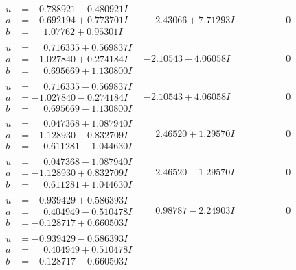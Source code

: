 \documentclass[1p]{elsarticle_modified}
\theoremstyle{definition}
\begin{document}
$$\begin{array}{c|c|c}
\begin{aligned}
u &= -0.788921 - 0.480921 I \\
a &= -0.692194 + 0.773701 I \\
b &= \phantom{-}1.07762 + 0.95301 I\end{aligned}
 & \phantom{-}2.43066 + 7.71293 I & \phantom{-0.000000 } 0 \\ \hline\begin{aligned}
u &= \phantom{-}0.716335 + 0.569837 I \\
a &= -1.027840 + 0.274184 I \\
b &= \phantom{-}0.695669 + 1.130800 I\end{aligned}
 & -2.10543 - 4.06058 I & \phantom{-0.000000 } 0 \\ \hline\begin{aligned}
u &= \phantom{-}0.716335 - 0.569837 I \\
a &= -1.027840 - 0.274184 I \\
b &= \phantom{-}0.695669 - 1.130800 I\end{aligned}
 & -2.10543 + 4.06058 I & \phantom{-0.000000 } 0 \\ \hline\begin{aligned}
u &= \phantom{-}0.047368 + 1.087940 I \\
a &= -1.128930 - 0.832709 I \\
b &= \phantom{-}0.611281 - 1.044630 I\end{aligned}
 & \phantom{-}2.46520 + 1.29570 I & \phantom{-0.000000 } 0 \\ \hline\begin{aligned}
u &= \phantom{-}0.047368 - 1.087940 I \\
a &= -1.128930 + 0.832709 I \\
b &= \phantom{-}0.611281 + 1.044630 I\end{aligned}
 & \phantom{-}2.46520 - 1.29570 I & \phantom{-0.000000 } 0 \\ \hline\begin{aligned}
u &= -0.939429 + 0.586393 I \\
a &= \phantom{-}0.404949 - 0.510478 I \\
b &= -0.128717 + 0.660503 I\end{aligned}
 & \phantom{-}0.98787 - 2.24903 I & \phantom{-0.000000 } 0 \\ \hline\begin{aligned}
u &= -0.939429 - 0.586393 I \\
a &= \phantom{-}0.404949 + 0.510478 I \\
b &= -0.128717 - 0.660503 I\end{aligned}

\end{array}$$
\end{document}
